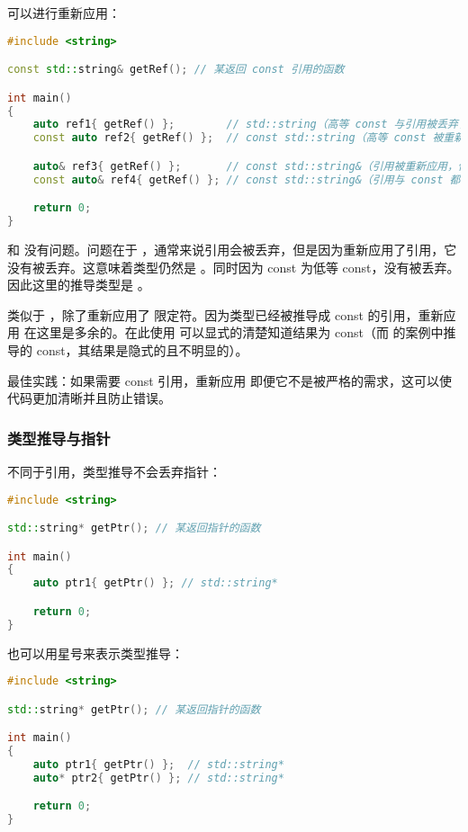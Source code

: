 \documentclass[../../LearnCpp.tex]{subfiles}
\begin{document}
可以进行重新应用：

\begin{lstlisting}[language=C++]
#include <string>

const std::string& getRef(); // 某返回 const 引用的函数

int main()
{
    auto ref1{ getRef() };        // std::string（高等 const 与引用被丢弃了）
    const auto ref2{ getRef() };  // const std::string（高等 const 被重新应用，引用被丢弃了）

    auto& ref3{ getRef() };       // const std::string&（引用被重新应用，低等 const 未被丢弃）
    const auto& ref4{ getRef() }; // const std::string&（引用与 const 都被重新应用）

    return 0;
}
\end{lstlisting}

 和  没有问题。问题在于 ，通常来说引用会被丢弃，但是因为重新应用了引用，它没有被丢弃。这意味着类型仍然是 。同时因为 const 为低等 const，没有被丢弃。因此这里的推导类型是 。

 类似于 ，除了重新应用了  限定符。因为类型已经被推导成 const 的引用，重新应用  在这里是多余的。在此使用  可以显式的清楚知道结果为 const（而  的案例中推导的 const，其结果是隐式的且不明显的）。

最佳实践：如果需要 const 引用，重新应用  即便它不是被严格的需求，这可以使代码更加清晰并且防止错误。

\subsubsection*{类型推导与指针}

不同于引用，类型推导不会丢弃指针：

\begin{lstlisting}[language=C++]
#include <string>

std::string* getPtr(); // 某返回指针的函数

int main()
{
    auto ptr1{ getPtr() }; // std::string*

    return 0;
}
\end{lstlisting}

也可以用星号来表示类型推导：

\begin{lstlisting}[language=C++]
#include <string>

std::string* getPtr(); // 某返回指针的函数

int main()
{
    auto ptr1{ getPtr() };  // std::string*
    auto* ptr2{ getPtr() }; // std::string*

    return 0;
}
\end{lstlisting}
\end{document}
